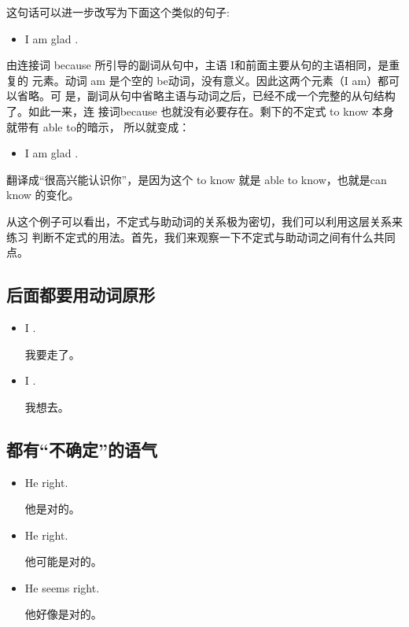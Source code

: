 这句话可以进一步改写为下面这个类似的句子:

\begin{itemize}
\item  I am glad .
\end{itemize}

由连接词 because 所引导的副词从句中，主语 I和前面主要从句的主语相同，是重复的
元素。动词 am 是个空的 be动词，没有意义。因此这两个元素（I am）都可以省略。可
是，副词从句中省略主语与动词之后，已经不成一个完整的从句结构了。如此一来，连
接词because 也就没有必要存在。剩下的不定式 to know 本身就带有 able to的暗示，
所以就变成：

\begin{itemize}
\item  I am glad .
\end{itemize}

翻译成“很高兴能认识你”，是因为这个 to know 就是 able to know，也就是can
know 的变化。

从这个例子可以看出，不定式与助动词的关系极为密切，我们可以利用这层关系来练习
判断不定式的用法。首先，我们来观察一下不定式与助动词之间有什么共同点。

\subsection{后面都要用动词原形}

\begin{itemize}
\item I .

  我要走了。
\item I .

  我想去。
\end{itemize}

\subsection{都有“不确定”的语气}

\begin{itemize}
\item He  right.

  他是对的。
\item He  right.

  他可能是对的。
\item He seems  right.

  他好像是对的。
\end{itemize}

